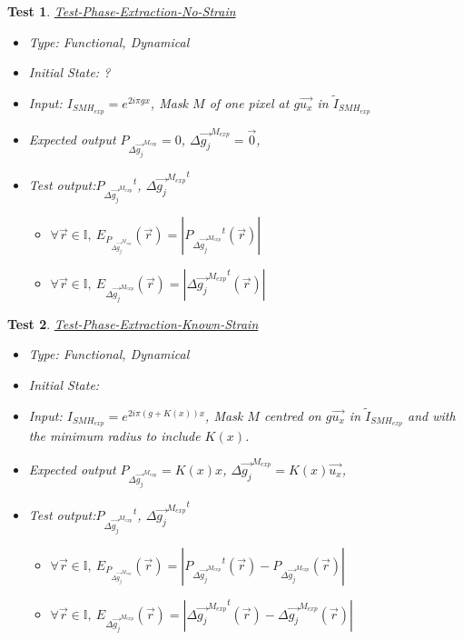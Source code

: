 \documentclass[12pt, titlepage]{article}
\newtheorem{Test}{Test}
\begin{document}
\begin{Test}\normalfont\underline{Test-Phase-Extraction-No-Strain}
\label{T_Phase-Extraction-No-Strain}
\begin{itemize}
\item Type: Functional, Dynamical
\item Initial State: ?
\item Input: $I_{SMH_{exp}}=e^{2i\pi gx}$, Mask $M$ of one pixel at $g\overrightarrow{u_x}$ in $\widetilde{I}_{SMH_{exp}}$
\item Expected output $P_{\Delta \overrightarrow{g_{j}}^{M_{exp}}}=0$, $\Delta \overrightarrow{g_{j}}^{M_{exp}}=\overrightarrow{0}$, 
\item Test output:${P_{\Delta \overrightarrow{g_{j}}^{M_{exp}}}}^{t}$, $\Delta {\overrightarrow{g_{j}}^{M_{exp}}}^{t}$
	\begin{itemize}
	\item $\forall \vec{r} \in \mathbb{I}, \ E_{P_{\Delta \overrightarrow{g_{j}}^{M_{exp}}}}(\vec{r})=|{P_{\Delta \overrightarrow{g_{j}}^{M_{exp}}}}^{t}(\vec{r})|$
	\item $\forall \vec{r} \in \mathbb{I}, \ E_{\Delta {\overrightarrow{g_{j}}^{M_{exp}}}}(\vec{r})=|{\Delta {\overrightarrow{g_{j}}^{M_{exp}}}}^t(\vec{r})|$
	\end{itemize}  
\end{itemize}
\end{Test}

\begin{Test}\normalfont\underline{Test-Phase-Extraction-Known-Strain}
\label{T_Phase-Extraction-Known-Strain}
\begin{itemize}
\item Type: Functional, Dynamical
\item Initial State:
\item Input: $I_{SMH_{exp}}=e^{2i\pi (g+K(x))x}$, Mask $M$ centred on $g\overrightarrow{u_x}$ in $\widetilde{I}_{SMH_{exp}}$ and with the minimum radius to include $K(x)$. 
\item Expected output $P_{\Delta \overrightarrow{g_{j}}^{M_{exp}}}=K(x)x$, $\Delta \overrightarrow{g_{j}}^{M_{exp}}=K(x)\overrightarrow{u_x}$, 
\item Test output:${P_{\Delta \overrightarrow{g_{j}}^{M_{exp}}}}^{t}$, $\Delta {\overrightarrow{g_{j}}^{M_{exp}}}^{t}$
	\begin{itemize}
	\item $\forall \vec{r} \in \mathbb{I}, \ E_{P_{\Delta \overrightarrow{g_{j}}^{M_{exp}}}}(\vec{r})=|{P_{\Delta \overrightarrow{g_{j}}^{M_{exp}}}}^{t}(\vec{r})-P_{\Delta \overrightarrow{g_{j}}^{M_{exp}}}(\vec{r})|$
	\item $\forall \vec{r} \in \mathbb{I}, \ E_{\Delta {\overrightarrow{g_{j}}^{M_{exp}}}}(\vec{r})=|{\Delta {\overrightarrow{g_{j}}^{M_{exp}}}}^t(\vec{r})-{\Delta {\overrightarrow{g_{j}}^{M_{exp}}}}(\vec{r})|$
	\end{itemize}  
\end{itemize}
\end{Test}				
 
\end{document}
